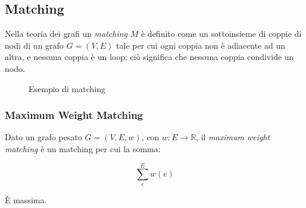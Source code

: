 \subsection{Matching}
Nella teoria dei grafi un \textit{matching} $M$ è definito come un sottoinsieme di coppie di nodi di un grafo $G = (V, E)$ tale per cui ogni coppia non è adiacente ad un altra, e nessuna coppia è un loop; ciò significa che nessuna coppia condivide un nodo.

\begin{figure}[h]
    \centering
    \caption{Esempio di matching}
    \label{fig:intro-extra-matching}
\end{figure}

\subsubsection{Maximum Weight Matching}
\label{chap:intro-extra-matching-maxw}
Dato un grafo pesato $G = (V, E, w)$, con $w: E \rightarrow \mathbb{R}$, il \textit{maximum weight matching} è un matching per cui la somma:

\begin{equation}
    \label{eq:intro-extra-matching-maxw}
    \sum_e^{E} w(e)
\end{equation}

È massima. 